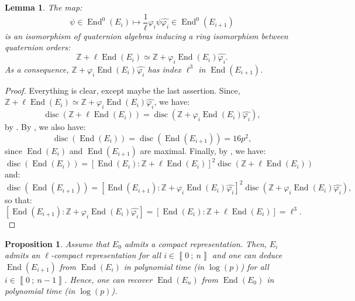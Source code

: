 \documentclass[a4paper,10pt,notitlepage]{report}
\theoremstyle{definition}
\theoremstyle{plain}
\newtheorem{Proposition}[Definition]{Proposition}
\newtheorem{Lemma}[Definition]{Lemma}
\theoremstyle{definition}
\newcommand{\Z}{\mathbb{Z}}
\renewcommand{\i}[2]{\left\llbracket #1~;~#2\right\rrbracket}
\renewcommand{\(}{\left(}
\renewcommand{\)}{\right)}
\DeclareMathOperator{\End}{End}
\DeclareMathOperator{\disc}{disc}
\begin{document}
\begin{Lemma}\label{Lemma 3}
The map:
\[\psi\in\End^0(E_i)\longmapsto \frac{1}{\ell}\varphi_i\psi\widehat{\varphi_i}\in \End^0(E_{i+1})\]
is an isomorphism of quaternion algebras inducing a ring isomorphism between quaternion orders:
\[\Z+\ell\End(E_i)\simeq \Z+\varphi_i\End(E_i)\widehat{\varphi_i}.\]
As a consequence, $\Z+\varphi_i\End(E_i)\widehat{\varphi_i}$ has index $\ell^3$ in $\End(E_{i+1})$.
\end{Lemma}

\begin{proof}
Everything is clear, except maybe the last assertion.  Since, $\Z+\ell\End(E_i)\simeq \Z+\varphi_i\End(E_i)\widehat{\varphi_i}$, we have:
\[\disc(\Z+\ell\End(E_i))=\disc(\Z+\varphi_i\End(E_i)\widehat{\varphi_i}),\]
by \cite[Corollary 15.2.9]{Voight}. By \cite[Theorem 15.5.5]{Voight}, we also have:
\[\disc(\End(E_i))=\disc(\End(E_{i+1}))=16p^2,\]
since $\End(E_i)$ and $\End(E_{i+1})$ are maximal. Finally, by \cite[Lemma 15.2.15]{Voight}, we have:
\[\disc(\End(E_i))=[\End(E_i):\Z+\ell\End(E_i)]^2\disc(\Z+\ell\End(E_i))\]
and:
\[\disc(\End(E_{i+1}))=[\End(E_{i+1}):\Z+\varphi_i\End(E_i)\widehat{\varphi_i}]^2\disc(\Z+\varphi_i\End(E_i)\widehat{\varphi_i}),\]
so that:
\[[\End(E_{i+1}):\Z+\varphi_i\End(E_i)\widehat{\varphi_i}]=[\End(E_i):\Z+\ell\End(E_i)]=\ell^3.\]
\end{proof}

\begin{Proposition}
Assume that $E_0$ admits a compact representation.  Then, $E_i$ admits an $\ell$-compact representation for all $i\in\i{0}{n}$ and one can deduce $\End(E_{i+1})$ from $\End(E_i)$ in polynomial time (in $\log(p)$) for all $i\in\i{0}{n-1}$. Hence, one can recover $\End(E_n)$ from $\End(E_0)$ in polynomial time (in $\log(p)$).
\end{Proposition}
\end{document}
